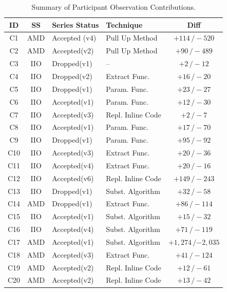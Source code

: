 \documentclass[10pt,conference]{IEEEtran}
\begin{document}
\begin{table}[ht]
\centering
\begin{threeparttable}
  \caption{Summary of Participant Observation Contributions.}
  \label{lbl:patches-summary}
\begin{tabularx}{\columnwidth}{ c c l X c }
\toprule
\textbf{ID} & \textbf{SS} & \textbf{Series Status} & \textbf{Technique} & \textbf{Diff} \\
\midrule
C1 & AMD & Accepted (v4) & Pull Up Method & $+114\,/\!-\!520$ \\
C2 & AMD & Accepted\hfill(v2) & Pull Up Method & $+90\,/\!-\!489$ \\
C3 & IIO & Dropped\hfill(v1) & -- & $+2\,/\!-\!12$ \\
C4 & IIO & Dropped\hfill(v2) & Extract Func. & $+16\,/\!-\!20$ \\
C5 & IIO & Dropped\hfill(v1) & Param. Func. & $+23\,/\!-\!27$ \\
C6 & IIO & Accepted\hfill(v1) & Param. Func. & $+12\,/\!-\!30$ \\
C7 & IIO & Accepted\hfill(v3) & Repl. Inline Code & $+2\,/\!-\!7$ \\
C8 & IIO & Accepted\hfill(v1) & Param. Func. & $+17\,/\!-\!70$ \\
C9 & IIO & Dropped\hfill(v1) & Param. Func. & $+95\,/\!-\!92$ \\
C10 & IIO & Accepted\hfill(v3) & Extract Func. & $+20\,/\!-\!36$ \\
C11 & IIO & Accepted\hfill(v4) & Extract Func. & $+20\,/\!-\!16$ \\
C12 & IIO & Accepted\hfill(v6) & Repl. Inline Code & $+149\,/\!-\!243$ \\
C13 & IIO & Dropped\hfill(v1) & Subst. Algorithm & $+32\,/\!-\!58$ \\
C14 & AMD & Dropped\hfill(v1) & Extract Func. & $+86\,/\!-\!114$ \\
C15 & IIO & Accepted\hfill(v1) & Subst. Algorithm & $+15\,/\!-\!32$ \\
C16 & IIO & Accepted\hfill(v4) & Subst. Algorithm & $+71\,/\!-\!119$ \\
C17 & AMD & Accepted\hfill(v1) & Subst. Algorithm & {\scriptsize$+$}$1{,}274\,/${\scriptsize$-$}$2{,}035$ \\
C18 & AMD & Accepted\hfill(v3) & Extract Func. & $+41\,/\!-\!124$ \\
C19 & AMD & Accepted\hfill(v2) & Repl. Inline Code & $+12\,/\!-\!61$ \\
C20 & AMD & Accepted\hfill(v2) & Repl. Inline Code & $+13\,/\!-\!42$ \\

\end{tabularx}
\end{threeparttable}
\end{table}
\end{document}
